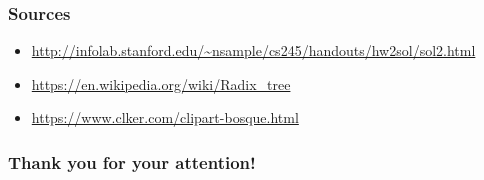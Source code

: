 \documentclass{beamer}
\begin{document}
\begin{frame}
\frametitle{Sources}
\begin{itemize}
	\item \url{http://infolab.stanford.edu/~nsample/cs245/handouts/hw2sol/sol2.html}
	\item \url{https://en.wikipedia.org/wiki/Radix\_tree}
	\item \url{https://www.clker.com/clipart-bosque.html}
\end{itemize}
\end{frame}

\begin{frame}
 \frametitle{Thank you for your attention!}
\end{frame}
\end{document}

